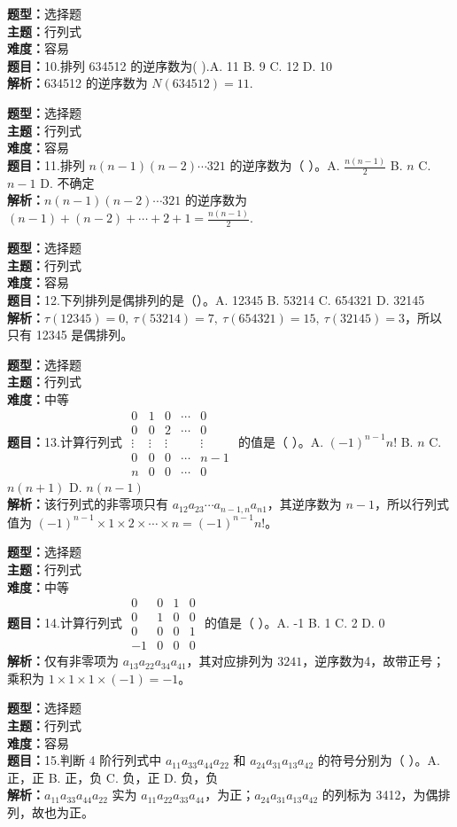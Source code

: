 \documentclass{ctexart}
\newenvironment{question}[5]{%
	\noindent\textbf{题型：}#1\\
	\textbf{主题：}#2\\
	\textbf{难度：}#3\\
	\textbf{题目：}#4\\
	\textbf{解析：}#5\\
	\vspace{1em}
}{}
\begin{document}
	\begin{question}
		{选择题}
		{行列式}
		{容易}
		{10.排列 634512 的逆序数为(  ).A. 11 B. 9 C. 12 D. 10}
		{634512 的逆序数为 $N(634512)=11$.}
	\end{question}
	
	
	\begin{question}
		{选择题}
		{行列式}
		{容易}
		{11.排列 $n(n-1)(n-2)\cdots321$ 的逆序数为（ ）。A. $\frac{n(n-1)}{2}$ B. $n$ C. $n-1$ D. 不确定}
		{$n(n-1)(n-2)\cdots321$ 的逆序数为 $(n-1)+(n-2)+\cdots+2+1=\frac{n(n-1)}{2}$.}
	\end{question}
	
	\begin{question}
		{选择题}
		{行列式}
		{容易}
		{12.下列排列是偶排列的是（）。A. 12345 B. 53214 C. 654321 D. 32145}
		{$\tau(12345)=0,\ \tau(53214)=7,\ \tau(654321)=15,\ \tau(32145)=3$，所以只有 12345 是偶排列。}
	\end{question}
	
	\begin{question}
		{选择题}
		{行列式}
		{中等}
		{13.计算行列式 $\begin{matrix}0 & 1 & 0 & \cdots & 0 \\ 0 & 0 & 2 & \cdots & 0 \\ \vdots & \vdots & \vdots & & \vdots \\ 0 & 0 & 0 & \cdots & n-1 \\ n & 0 & 0 & \cdots & 0\end{matrix}$ 的值是（ ）。A. $(-1)^{n-1}n!$ B. $n$ C. $n(n+1)$ D. $n(n-1)$}
		{该行列式的非零项只有 $a_{12}a_{23}\cdots a_{n-1,n}a_{n1}$，其逆序数为 $n-1$，所以行列式值为 $(-1)^{n-1}\times1\times2\times\cdots\times n = (-1)^{n-1}n!$。}
	\end{question}
	
	\begin{question}
		{选择题}
		{行列式}
		{中等}
		{14.计算行列式 $\begin{matrix}0 & 0 & 1 & 0 \\ 0 & 1 & 0 & 0 \\ 0 & 0 & 0 & 1 \\ -1 & 0 & 0 & 0\end{matrix}$ 的值是（ ）。A. -1 B. 1 C. 2 D. 0}
		{仅有非零项为 $a_{13}a_{22}a_{34}a_{41}$，其对应排列为 $3241$，逆序数为4，故带正号；乘积为 $1\times1\times1\times(-1) = -1$。}
	\end{question}
	
	\begin{question}
		{选择题}
		{行列式}
		{容易}
		{15.判断 4 阶行列式中 $a_{11}a_{33}a_{44}a_{22}$ 和 $a_{24}a_{31}a_{13}a_{42}$ 的符号分别为（ ）。A. 正，正 B. 正，负 C. 负，正 D. 负，负}
		{$a_{11}a_{33}a_{44}a_{22}$ 实为 $a_{11}a_{22}a_{33}a_{44}$，为正；$a_{24}a_{31}a_{13}a_{42}$ 的列标为 3412，为偶排列，故也为正。}
	\end{question}
	
\end{document}
